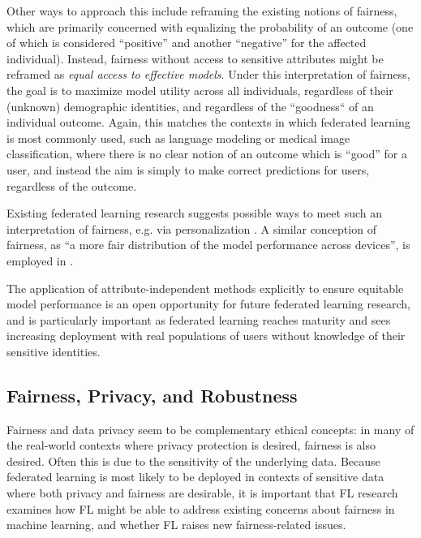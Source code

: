 \documentclass[11pt]{article}
\begin{document}
Other ways to approach this include reframing the existing notions of fairness, which are primarily concerned with equalizing the probability of an outcome (one of which is considered ``positive'' and another ``negative'' for the affected individual). Instead, fairness without access to sensitive attributes might be reframed as \textit{equal access to effective models}. Under this interpretation of fairness, the goal is to maximize model utility across all individuals, regardless of their (unknown) demographic identities, and regardless of the ``goodness`` of an individual outcome. Again, this matches the contexts in which federated learning is most commonly used, such as language modeling or medical image classification, where there is no clear notion of an outcome which is ``good'' for a user, and instead the aim is simply to make correct predictions for users, regardless of the outcome.

Existing federated learning research suggests possible ways to meet such an interpretation of fairness, e.g. via personalization \cite{jiang2019improving, wang2019federated}. A similar conception of fairness, as ``a more
fair distribution of the model performance across devices'', is employed in \cite{li2019fair}. 

The application of attribute-independent methods explicitly to ensure equitable model performance is an open opportunity for future federated learning research, and is particularly important as federated learning reaches maturity and sees increasing deployment with real populations of users without knowledge of their sensitive identities.

\subsection{Fairness, Privacy, and Robustness}\label{subsec:fairness-privacy-robustness}

Fairness and data privacy seem to be complementary ethical concepts: in many of the real-world contexts where privacy protection is desired, fairness is also desired. Often this is due to the sensitivity of the underlying data. Because federated learning is most likely to be deployed in contexts of sensitive data where both privacy and fairness are desirable, it is important that FL research examines how FL might be able to address existing concerns about fairness in machine learning, and whether FL raises new fairness-related issues.
\end{document}
